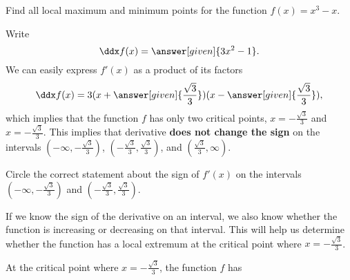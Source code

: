 \documentclass{ximera}
\begin{document}
\begin{example}
Find all local maximum and minimum points for the function 
$f(x)=x^3-x$. 
\begin{explanation} 
Write
\[
\ddx f(x)=\answer[given]{3x^2-1}.
\] 
We can easily express  $f'(x)$ as a product of its factors
\[
\ddx f(x)=3(x+\answer[given]{\frac{\sqrt{3}}{3}})(x-\answer[given]{\frac{\sqrt{3}}{3}}),
\] 
which implies that the function $f$ has only two critical points, $x=-\frac{\sqrt{3}}{3}$ and  $x=-\frac{\sqrt{3}}{3}$. This implies that derivative \textbf{does not change the sign} on the intervals $(-\infty,-\frac{\sqrt{3}}{3})$, $(-\frac{\sqrt{3}}{3},\frac{\sqrt{3}}{3})$, and $(\frac{\sqrt{3}}{3},\infty)$. 
\begin{question}
Circle the correct  statement about the sign of $f'(x)$ on the intervals $(-\infty,-\frac{\sqrt{3}}{3})$ and $(-\frac{\sqrt{3}}{3},\frac{\sqrt{3}}{3})$. \\
 
  \begin{multipleChoice}
  \end{multipleChoice}
  \end{question}
  If we know the sign of the derivative on an interval, we also know whether the function is increasing or decreasing on that interval. This will help us determine whether the function has a local extremum at the critical point  where $x=-\frac{\sqrt{3}}{3}$. \\
  \begin{question}

At the critical point where $x=-\frac{\sqrt{3}}{3}$, the function $f$ has  \\
 

\end{question}
\end{explanation}
\end{example}
\end{document}
